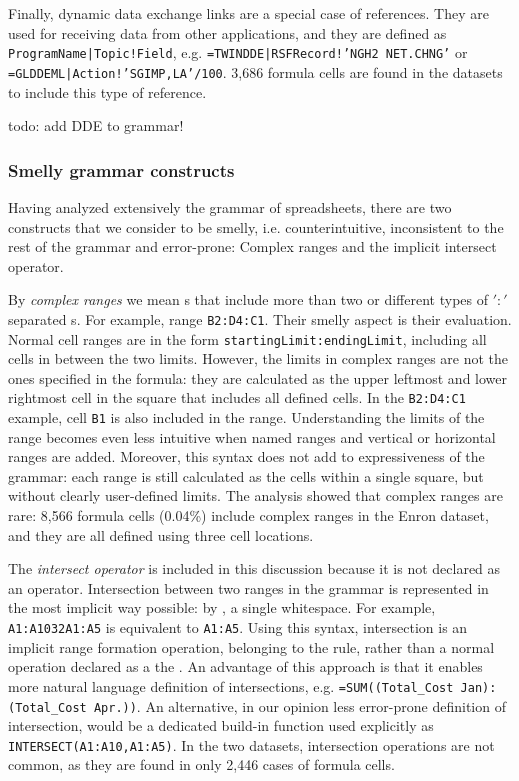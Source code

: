 \documentclass[conference]{IEEEtran}
\begin{document}
Finally, dynamic data exchange links are a special case of references. They are used for receiving data from other applications, and they are defined as \texttt{ProgramName|Topic!Field}, e.g. \texttt{=TWINDDE|RSFRecord!'NGH2 NET.CHNG'} or \texttt{=GLDDEML|Action!'SGIMP,LA'/100}. 3,686 formula cells are found in the datasets to include this type of reference.

todo: add DDE to grammar!
 
\subsubsection{Smelly grammar constructs}
Having analyzed extensively the grammar of spreadsheets, there are two constructs that we consider to be smelly, i.e. counterintuitive, inconsistent to the rest of the grammar and error-prone: Complex ranges and the implicit intersect operator.

By \textit{complex ranges} we mean s that include more than two or different types of $':'$ separated s. For example, range \texttt{B2:D4:C1}. Their smelly aspect is their evaluation. Normal cell ranges are in the form \texttt{startingLimit:endingLimit}, including all cells in between the two limits. However, the limits in complex ranges are not the ones specified in the formula: they are calculated as the upper leftmost and lower rightmost cell in the square that includes all defined cells. In the \texttt{B2:D4:C1} example, cell \texttt{B1} is also included in the range. Understanding the limits of the range becomes even less intuitive when named ranges and vertical or horizontal ranges are added. Moreover, this syntax does not add to expressiveness of the grammar: each range is still calculated as the cells within a single square, but without clearly user-defined limits. The analysis showed that complex ranges are rare: 8,566 formula cells	(0.04\%) include complex ranges in the Enron dataset, and they are all defined using three cell locations. 

The \textit{intersect operator} is included in this discussion because it is not declared as an operator. Intersection between two ranges in the grammar is represented in the most implicit way possible: by \texttt{}, a single whitespace. For example, \texttt{A1:A10\char32A1:A5} is equivalent to \texttt{A1:A5}. Using this syntax, intersection is an implicit range formation operation, belonging to the  rule, rather than a normal operation declared as a the . An advantage of this approach is that it enables more natural language definition of intersections, e.g.  \texttt{=SUM((Total_Cost Jan):(Total_Cost Apr.))}. An alternative, in our opinion less error-prone definition of intersection, would be a dedicated build-in function used explicitly as \texttt{INTERSECT(A1:A10,A1:A5)}. In the two datasets, intersection operations are not common, as they are found in only 2,446 cases of formula cells.
\end{document}
